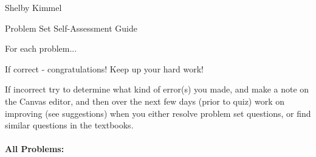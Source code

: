 \documentclass[12pt]{article}
\theoremstyle{definition}
\begin{document}
\hfill Shelby Kimmel

\begin{center}
{\huge Problem Set Self-Assessment Guide}
\end{center}
For each problem...

If correct - congratulations! Keep up your hard work!

If incorrect try to determine what kind of error(s) you made, and make a note on the Canvas editor, and then over the next few days (prior to quiz) work on improving (see suggestions) when you either resolve problem set questions, or find similar questions in the textbooks.

\paragraph{{\Large{All Problems:}}}
\end{document}
